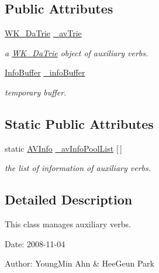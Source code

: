 \subsection*{Public Attributes}
\begin{CompactItemize}
\item 
\hyperlink{classkmaOrange_1_1WK__DaTrie}{WK\_\-DaTrie} \hyperlink{classkmaOrange_1_1AuxVerb_44837d41f1db9576652a529cb29488b3}{\_\-avTrie}
\begin{CompactList}\small\item\em a \hyperlink{classkmaOrange_1_1WK__DaTrie}{WK\_\-DaTrie} object of auxiliary verbs. \item\end{CompactList}\item 
\hyperlink{classkmaOrange_1_1InfoBuffer}{InfoBuffer} \hyperlink{classkmaOrange_1_1AuxVerb_d2a513a5da13dd067e84c45386b0af98}{\_\-infoBuffer}
\begin{CompactList}\small\item\em temporary buffer. \item\end{CompactList}\end{CompactItemize}
\subsection*{Static Public Attributes}
\begin{CompactItemize}
\item 
static \hyperlink{structkmaOrange_1_1AVInfo}{AVInfo} \hyperlink{classkmaOrange_1_1AuxVerb_701a88d643b13338185b36860a4b5a70}{\_\-avInfoPoolList} \mbox{[}$\,$\mbox{]}
\begin{CompactList}\small\item\em the list of information of auxiliary verbs. \item\end{CompactList}\end{CompactItemize}


\subsection{Detailed Description}
This class manages auxiliary verbs. 

\begin{Desc}
\item[Date:]2008-11-04 \end{Desc}
\begin{Desc}
\item[Author:]YoungMin Ahn \& HeeGeun Park \end{Desc}


